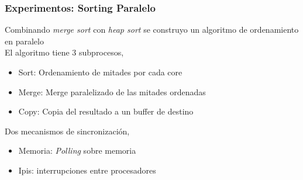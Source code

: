 \documentclass{beamer}
\begin{document}
\begin{frame}
  \frametitle{Experimentos: Sorting Paralelo}
  Combinando \emph{merge sort} con \emph{heap sort} se construyo un algoritmo de ordenamiento en paralelo\\
  \vspace{10pt}
  El algoritmo tiene 3 subprocesos,\\
  \vspace{10pt}
  \begin{itemize}
  \item Sort: Ordenamiento de mitades por cada core
  \item Merge: Merge paralelizado de las mitades ordenadas
  \item Copy: Copia del resultado a un buffer de destino
  \end{itemize}
  \vspace{10pt}
  Dos mecanismos de sincronización,\\
  \vspace{10pt}
  \begin{itemize}
  \item Memoria: \emph{Polling} sobre memoria
  \item Ipis: interrupciones entre procesadores
  \end{itemize}
\end{frame}

\end{document}
